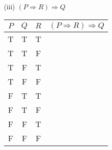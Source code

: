\documentclass{article}
\begin{document}
(iii) $(P \Rightarrow R) \Rightarrow Q$\\
\begin{tabular}{|c|c|c|c|}
    \hline
    $P$ & $Q$ & $R$ & $(P \Rightarrow R) \Rightarrow Q$ \\
    \hline
    T   & T   & T   &                                   \\
    T   & T   & F   &                                   \\
    T   & F   & T   &                                   \\
    T   & F   & F   &                                   \\
    F   & T   & T   &                                   \\
    F   & T   & F   &                                   \\
    F   & F   & T   &                                   \\
    F   & F   & F   &                                   \\
    \hline
\end{tabular}
\end{document}
